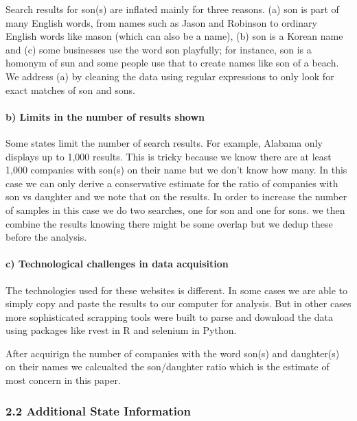 \documentclass[]{article}
\let\oldparagraph\paragraph
\renewcommand{\paragraph}[1]{\oldparagraph{#1}\mbox{}}
\begin{document}
Search results for son(s) are inflated mainly for three reasons. (a) son
is part of many English words, from names such as Jason and Robinson to
ordinary English words like mason (which can also be a name), (b) son is
a Korean name and (c) some businesses use the word son playfully; for
instance, son is a homonym of sun and some people use that to create
names like son of a beach. We address (a) by cleaning the data using
regular expressions to only look for exact matches of son and sons.

\hypertarget{b-limits-in-the-number-of-results-shown}{%
\paragraph{b) Limits in the number of results
shown}\label{b-limits-in-the-number-of-results-shown}}

Some states limit the number of search results. For example, Alabama
only displays up to 1,000 results. This is tricky because we know there
are at least 1,000 companies with son(s) on their name but we don't know
how many. In this case we can only derive a conservative estimate for
the ratio of companies with son vs daughter and we note that on the
results. In order to increase the number of samples in this case we do
two searches, one for son and one for sons. we then combine the results
knowing there might be some overlap but we dedup these before the
analysis.

\hypertarget{c-technological-challenges-in-data-acquisition}{%
\paragraph{c) Technological challenges in data
acquisition}\label{c-technological-challenges-in-data-acquisition}}

The technologies used for these websites is different. In some cases we
are able to simply copy and paste the results to our computer for
analysis. But in other cases more sophisticated scrapping tools were
built to parse and download the data using packages like rvest in R and
selenium in Python.

After acquirign the number of companies with the word son(s) and
daughter(s) on their names we calcualted the son/daughter ratio which is
the estimate of most concern in this paper.

\hypertarget{additional-state-information}{%
\subsubsection{2.2 Additional State
Information}\label{additional-state-information}}
\end{document}
